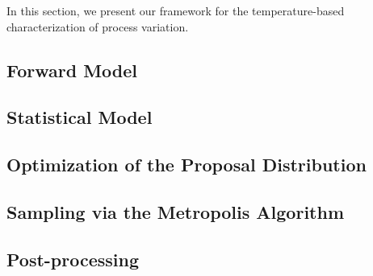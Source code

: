 In this section, we present our framework for the temperature-based characterization of process variation.

\subsection{Forward Model}   


\subsection{Statistical Model} 


\subsection{Optimization of the Proposal Distribution} 


\subsection{Sampling via the Metropolis Algorithm} 


\subsection{Post-processing} 

